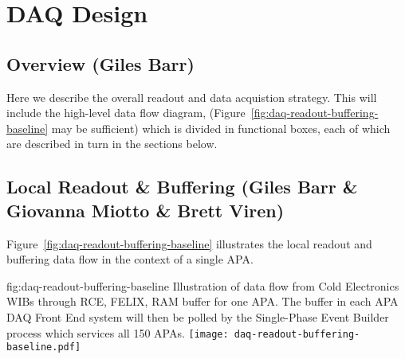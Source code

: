 
\section{DAQ Design}
\label{sec:fdsp-daq-design}



\subsection{Overview (Giles Barr)}
\label{sec:fdsp-daq-ltr}

Here we describe the overall readout and data acquistion
strategy. This will include the high-level data flow diagram,
(Figure~\ref{fig:daq-readout-buffering-baseline} may be sufficient)
which is divided in functional boxes, each of which are described in
turn in the sections below.

\subsection{Local Readout \& Buffering (Giles Barr \& Giovanna Miotto \& Brett Viren)}
\label{sec:fdsp-daq-ltr}


Figure~\ref{fig:daq-readout-buffering-baseline} illustrates the local
readout and buffering data flow in the context of a single APA.  

\begin{dunefigure}{fig:daq-readout-buffering-baseline}
  {Illustration of data flow from Cold Electronics WIBs through RCE,
    FELIX, RAM buffer for one APA.  The buffer in each APA DAQ Front
    End system will then be polled by the Single-Phase Event Builder
    process which services all 150 APAs.  }
\texttt{[image: daq-readout-buffering-baseline.pdf]}%
\end{dunefigure}


